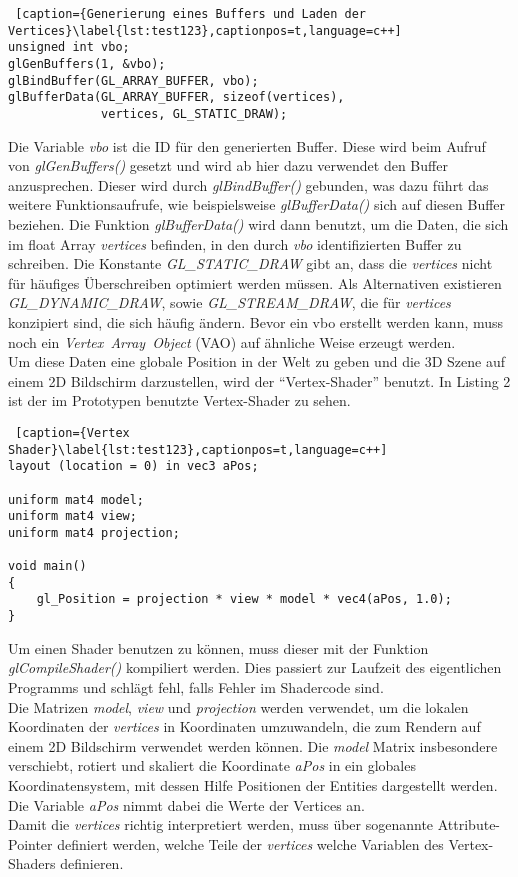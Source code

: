 \documentclass[11pt,a4paper]{article}
\begin{document}
\begin{lstlisting} [caption={Generierung eines Buffers und Laden der Vertices}\label{lst:test123},captionpos=t,language=c++]
unsigned int vbo;
glGenBuffers(1, &vbo);
glBindBuffer(GL_ARRAY_BUFFER, vbo);
glBufferData(GL_ARRAY_BUFFER, sizeof(vertices),
             vertices, GL_STATIC_DRAW);
\end{lstlisting}
\noindent
Die Variable \textit{vbo} ist die ID für den generierten Buffer. Diese wird beim Aufruf von \mbox{\textit{glGenBuffers()}} gesetzt und wird ab hier dazu verwendet den Buffer anzusprechen. Dieser wird durch \mbox{\textit{glBindBuffer()}} gebunden, was dazu führt das weitere Funktionsaufrufe, wie beispielsweise \mbox{\textit{glBufferData()}} sich auf diesen Buffer beziehen. Die Funktion \mbox{\textit{glBufferData()}} wird dann benutzt, um die Daten, die sich im float Array \mbox{\textit{vertices}} befinden, in den durch \mbox{\textit{vbo}} identifizierten Buffer zu schreiben. Die Konstante \mbox{\textit{GL\_STATIC\_DRAW}} gibt an, dass die \mbox{\textit{vertices}} nicht für häufiges Überschreiben optimiert werden müssen. Als Alternativen existieren \mbox{\textit{GL\_DYNAMIC\_DRAW}}, sowie \mbox{\textit{GL\_STREAM\_DRAW}}, die für \mbox{\textit{vertices}} konzipiert sind, die sich häufig ändern. Bevor ein vbo erstellt werden kann, muss noch ein \mbox{\textit{Vertex Array Object}} (VAO) auf ähnliche Weise erzeugt werden.\\
Um diese Daten eine globale Position in der Welt zu geben und die 3D Szene auf einem 2D Bildschirm darzustellen, wird der ``Vertex-Shader'' benutzt. In Listing 2 ist der im Prototypen benutzte Vertex-Shader zu sehen.

\begin{lstlisting} [caption={Vertex Shader}\label{lst:test123},captionpos=t,language=c++]
layout (location = 0) in vec3 aPos;

uniform mat4 model;
uniform mat4 view;
uniform mat4 projection;

void main()
{
	gl_Position = projection * view * model * vec4(aPos, 1.0);
}

\end{lstlisting}
\noindent
Um einen Shader benutzen zu können, muss dieser mit der Funktion \mbox{\textit{glCompileShader()}} kompiliert werden. Dies passiert zur Laufzeit des eigentlichen Programms und schlägt fehl, falls Fehler im Shadercode sind.\\
Die Matrizen \mbox{\textit{model}}, \mbox{\textit{view}} und \mbox{\textit{projection}} werden verwendet, um die lokalen Koordinaten der \mbox{\textit{vertices}} in Koordinaten umzuwandeln, die zum Rendern auf einem 2D Bildschirm verwendet werden können. Die \mbox{\textit{model}} Matrix insbesondere verschiebt, rotiert und skaliert die Koordinate \mbox{\textit{aPos}} in ein globales Koordinatensystem, mit dessen Hilfe Positionen der Entities dargestellt werden. Die Variable \mbox{\textit{aPos}} nimmt dabei die Werte der Vertices an.\\
Damit die \mbox{\textit{vertices}} richtig interpretiert werden, muss über sogenannte Attribute-Pointer definiert werden, welche Teile der \mbox{\textit{vertices}} welche Variablen des Vertex-Shaders definieren.
\end{document}
